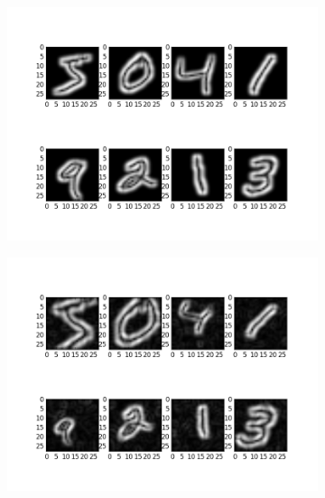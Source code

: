 \begin{figure}
	\centering
	\begin{subfigure}{0.5\textwidth}
		\centering
		\includegraphics[width=1\linewidth]{figures/Sobel.png}
		\caption{}
	\end{subfigure}%
	\begin{subfigure}{0.5\textwidth}
		\centering
		\includegraphics[width=1\linewidth]{figures/0-1.png}
		\caption{}
	\end{subfigure}
	\begin{subfigure}{0.5\textwidth}
		\centering

\end{subfigure}
\end{figure}
